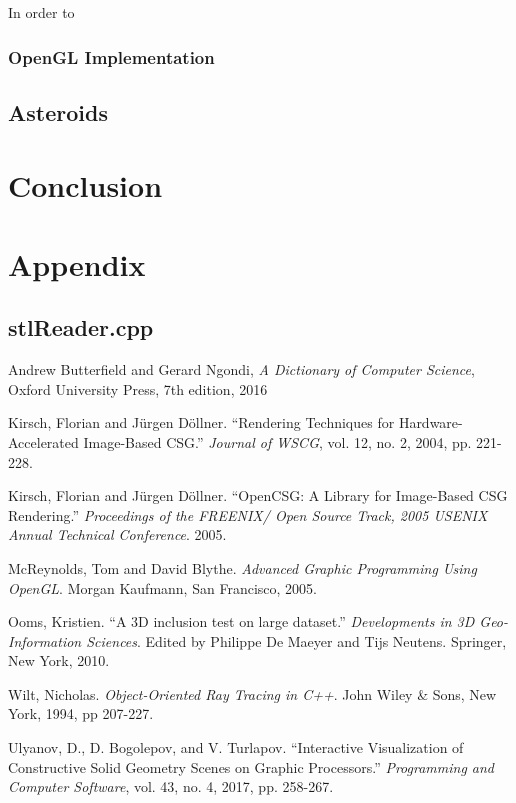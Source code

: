 \documentclass[12pt]{article}
\begin{document}
\noindent In order to 
\subsubsection{OpenGL Implementation}
\subsection{Asteroids}
\section{Conclusion}
\newpage
\section{Appendix}
\subsection{stlReader.cpp}

\newpage
\begin{thebibliography}{10}
  Andrew Butterfield and Gerard Ngondi,
  \textit{A Dictionary of Computer Science},
  Oxford University Press,
  7th edition,
  2016

  Kirsch, Florian and J\"{u}rgen D\"{o}llner. ``Rendering Techniques for Hardware-Accelerated Image-Based CSG.'' {\it Journal of WSCG}, vol. 12, no. 2, 2004, pp. 221-228.

  Kirsch, Florian and J\"{u}rgen D\"{o}llner. ``OpenCSG: A Library for Image-Based CSG Rendering.'' {\it Proceedings of the FREENIX/ Open Source Track, 2005 USENIX Annual Technical Conference}. 2005.

  McReynolds, Tom and David Blythe. {\it Advanced Graphic Programming Using OpenGL}. Morgan Kaufmann, San Francisco, 2005.

  Ooms, Kristien. ``A 3D inclusion test on large dataset.'' {\it Developments in 3D Geo-Information Sciences}. Edited by Philippe De Maeyer and Tijs Neutens. Springer, New York, 2010.

  Wilt, Nicholas. {\it Object-Oriented Ray Tracing in C++}. John Wiley \& Sons, New York, 1994, pp 207-227.

  Ulyanov, D., D. Bogolepov, and V. Turlapov. ``Interactive Visualization of Constructive Solid Geometry Scenes on Graphic Processors.'' {\it Programming and Computer Software}, vol. 43, no. 4, 2017, pp. 258-267.
\end{thebibliography}
\end{document}
